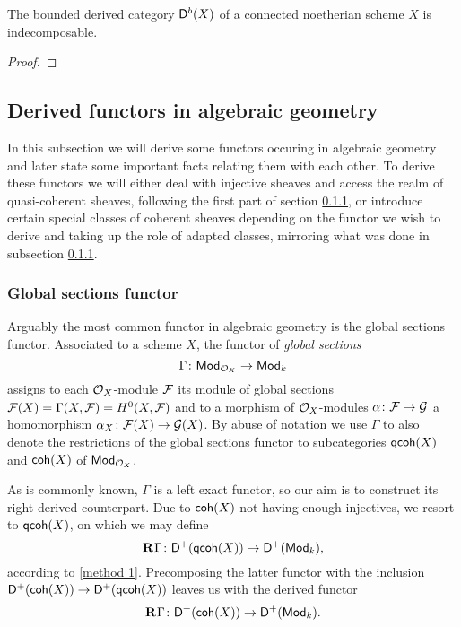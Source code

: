 \begin{theorem}\emph{\cite[\S 3, Proposition 3.10]{huybrechts2006fouriermukai}}
    The bounded derived category $\mathsf{D}^b(X)$ of a connected noetherian scheme $X$ is indecomposable.
\end{theorem}

\begin{proof}
    
\end{proof}


\newpage

\subsection{Derived functors in algebraic geometry}

In this subsection we will derive some functors occuring in algebraic geometry and later state some important facts relating them with each other. To derive these functors we will either deal with injective sheaves and access the realm of quasi-coherent sheaves, following the first part of section \ref{}, or introduce certain special classes of coherent sheaves depending on the functor we wish to derive and taking up the role of adapted classes, mirroring what was done in subsection \ref{}.

\subsubsection{Global sections functor}
Arguably the most common functor in algebraic geometry is the global sections functor. Associated to a scheme $X$, the functor of \emph{global sections}
\[
    \Gamma \colon \mathsf{Mod}_{\mathcal O_X} \to \mathsf{Mod}_{k}
\]
assigns to each $\mathcal O_X$-module $\mathcal F$ its module of global sections $\mathcal F(X) = \Gamma(X, \mathcal F) = H^0(X, \mathcal F)$ and to a morphism of $\mathcal O_X$-modules $\alpha\colon \mathcal F \to \mathcal G$ a homomorphism $\alpha_X \colon \mathcal F(X) \to \mathcal G(X)$.
By abuse of notation we use $\Gamma$ to also denote the restrictions of the global sections functor to subcategories $\mathsf{qcoh}(X)$ and $\mathsf{coh}(X)$ of $\mathsf{Mod}_{\mathcal O_X}$.

As is commonly known, $\Gamma$ is a left exact functor, so our aim is to construct its right derived counterpart. Due to $\mathsf{coh}(X)$ not having enough injectives, we resort to $\mathsf{qcoh}(X)$, on which we may define 
\[
    \mathbf{R}^{}\Gamma\colon \mathsf{D}^+(\mathsf{qcoh}(X)) \to \mathsf{D}^+(\mathsf{Mod}_{k}),
\]
according to \ref{method 1}. Precomposing the latter functor with the inclusion $\mathsf{D}^+(\mathsf{coh}(X)) \to \mathsf{D}^+(\mathsf{qcoh}(X))$ leaves us with the derived functor
\[
    \mathbf{R}^{}\Gamma \colon \mathsf{D}^+(\mathsf{coh}(X)) \to \mathsf{D}^+(\mathsf{Mod}_{k}).
\]







